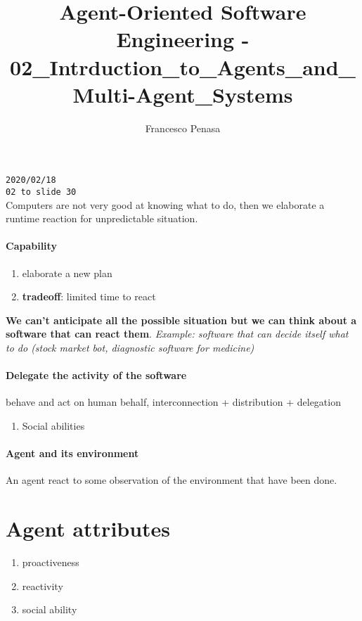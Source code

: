 \documentclass[11pt]{article}
\begin{document}
\author{Francesco Penasa}
\title{Agent-Oriented Software Engineering - 02\_Intrduction\_to\_Agents\_and\_Multi-Agent\_Systems}
\maketitle

\medskip

\texttt{2020/02/18}\\
\texttt{02 to slide 30}\\
Computers are not very good at knowing what to do, then we elaborate a runtime reaction for unpredictable situation.
\paragraph{Capability} %
\label{par:capability}
\begin{enumerate}
	\item elaborate a new plan
	\item \textbf{tradeoff}: limited time to react
\end{enumerate}

\textbf{We can't anticipate all the possible situation but we can think about a software that can react them}.
\textit{Example: software that can decide itself what to do (stock market bot, diagnostic software for medicine)}



\paragraph{Delegate the activity of the software} %
\label{par:delegate_the_activity_of_the_software}
behave and act on human behalf, interconnection + distribution + delegation
\begin{enumerate}
	\item Social abilities
\end{enumerate}

\paragraph{Agent and its environment} %
\label{par:agent_and_its_environment}
An agent react to some observation of the environment that have been done.

\section{Agent attributes} %
\label{sec:agent_attributes}
\begin{enumerate}
	\item proactiveness
	\item reactivity
	\item social ability
\end{enumerate}
\end{document}
